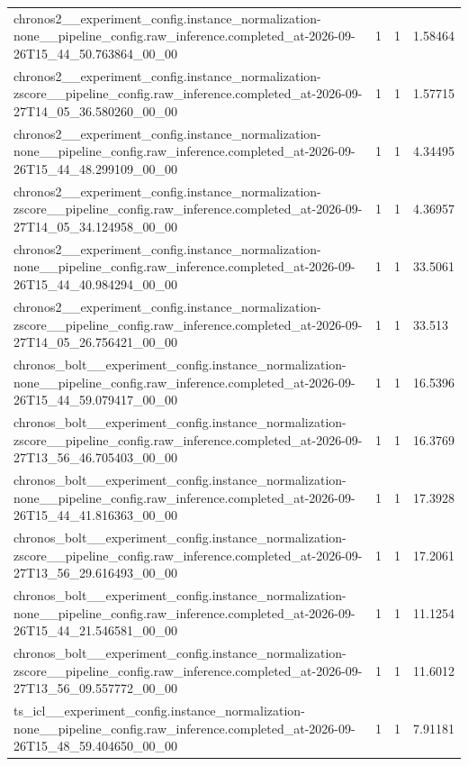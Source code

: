 \begin{tabular}{llll}
chronos2\_\_experiment\_config.instance\_normalization-none\_\_pipeline\_config.raw\_inference.completed\_at-2026-09-26T15\_44\_50.763864\_00\_00 & 1 & 1 & 1.58464 \\
chronos2\_\_experiment\_config.instance\_normalization-zscore\_\_pipeline\_config.raw\_inference.completed\_at-2026-09-27T14\_05\_36.580260\_00\_00 & 1 & 1 & 1.57715 \\
chronos2\_\_experiment\_config.instance\_normalization-none\_\_pipeline\_config.raw\_inference.completed\_at-2026-09-26T15\_44\_48.299109\_00\_00 & 1 & 1 & 4.34495 \\
chronos2\_\_experiment\_config.instance\_normalization-zscore\_\_pipeline\_config.raw\_inference.completed\_at-2026-09-27T14\_05\_34.124958\_00\_00 & 1 & 1 & 4.36957 \\
chronos2\_\_experiment\_config.instance\_normalization-none\_\_pipeline\_config.raw\_inference.completed\_at-2026-09-26T15\_44\_40.984294\_00\_00 & 1 & 1 & 33.5061 \\
chronos2\_\_experiment\_config.instance\_normalization-zscore\_\_pipeline\_config.raw\_inference.completed\_at-2026-09-27T14\_05\_26.756421\_00\_00 & 1 & 1 & 33.513 \\
chronos\_bolt\_\_experiment\_config.instance\_normalization-none\_\_pipeline\_config.raw\_inference.completed\_at-2026-09-26T15\_44\_59.079417\_00\_00 & 1 & 1 & 16.5396 \\
chronos\_bolt\_\_experiment\_config.instance\_normalization-zscore\_\_pipeline\_config.raw\_inference.completed\_at-2026-09-27T13\_56\_46.705403\_00\_00 & 1 & 1 & 16.3769 \\
chronos\_bolt\_\_experiment\_config.instance\_normalization-none\_\_pipeline\_config.raw\_inference.completed\_at-2026-09-26T15\_44\_41.816363\_00\_00 & 1 & 1 & 17.3928 \\
chronos\_bolt\_\_experiment\_config.instance\_normalization-zscore\_\_pipeline\_config.raw\_inference.completed\_at-2026-09-27T13\_56\_29.616493\_00\_00 & 1 & 1 & 17.2061 \\
chronos\_bolt\_\_experiment\_config.instance\_normalization-none\_\_pipeline\_config.raw\_inference.completed\_at-2026-09-26T15\_44\_21.546581\_00\_00 & 1 & 1 & 11.1254 \\
chronos\_bolt\_\_experiment\_config.instance\_normalization-zscore\_\_pipeline\_config.raw\_inference.completed\_at-2026-09-27T13\_56\_09.557772\_00\_00 & 1 & 1 & 11.6012 \\
ts\_icl\_\_experiment\_config.instance\_normalization-none\_\_pipeline\_config.raw\_inference.completed\_at-2026-09-26T15\_48\_59.404650\_00\_00 & 1 & 1 & 7.91181 \\

\end{tabular}
